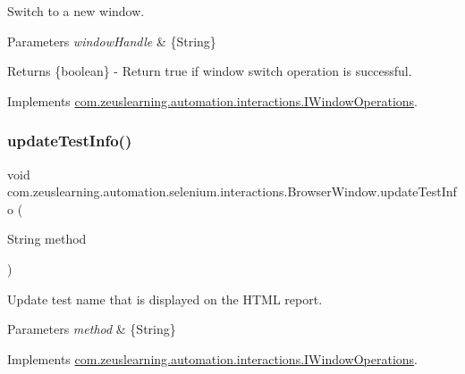 Switch to a new window.


\begin{DoxyParams}{Parameters}
{\em window\+Handle} & \{String\} \\
\hline
\end{DoxyParams}
\begin{DoxyReturn}{Returns}
\{boolean\} -\/ Return {\ttfamily true} if window switch operation is successful. 
\end{DoxyReturn}


Implements \hyperlink{interfacecom_1_1zeuslearning_1_1automation_1_1interactions_1_1IWindowOperations_ab79086f48e864eb7a2dcf3b53d94dc2b}{com.\+zeuslearning.\+automation.\+interactions.\+I\+Window\+Operations}.

\hypertarget{classcom_1_1zeuslearning_1_1automation_1_1selenium_1_1interactions_1_1BrowserWindow_ac5cee2e884ceca2b0d7367e40aff6942}{}\label{classcom_1_1zeuslearning_1_1automation_1_1selenium_1_1interactions_1_1BrowserWindow_ac5cee2e884ceca2b0d7367e40aff6942} 
\subsubsection{\texorpdfstring{update\+Test\+Info()}{updateTestInfo()}\hspace{0.1cm}{\footnotesize\ttfamily [1/2]}}
{\footnotesize\ttfamily void com.\+zeuslearning.\+automation.\+selenium.\+interactions.\+Browser\+Window.\+update\+Test\+Info (\begin{DoxyParamCaption}\item[{String}]{method }\end{DoxyParamCaption})\hspace{0.3cm}{\ttfamily [inline]}}

Update test name that is displayed on the H\+T\+ML report.


\begin{DoxyParams}{Parameters}
{\em method} & \{String\} \\
\hline
\end{DoxyParams}


Implements \hyperlink{interfacecom_1_1zeuslearning_1_1automation_1_1interactions_1_1IWindowOperations_aa9d371c94ab4c3ba4c1d9cdca0fc4532}{com.\+zeuslearning.\+automation.\+interactions.\+I\+Window\+Operations}.

